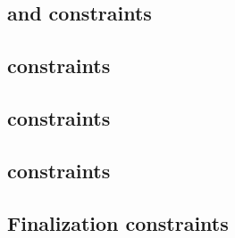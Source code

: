 \subsection{\ct{} and \maxCt{} constraints                                                            \lispTodo{}}  \label{rlp auth: generalities: ct and ct_max}                              
\subsection{\rlpAuthUtilsColumnSizeCountdown{} constraints                                            \lispTodo{}}  \label{rlp auth: generalities: byte size countdown constraints}            
\subsection{\authorityIsSenderAcc{} constraints                                                       \lispTodo{}}  \label{rlp auth: generalities: sender is authority acc}                    
\subsection{\authorityIsSenderTot{} constraints                                                       \lispTodo{}}  \label{rlp auth: generalities: sender is authority tot}                    
\subsection{Finalization constraints                                                                  \lispTodo{}}  \label{rlp auth: generalities: finalization}                               



